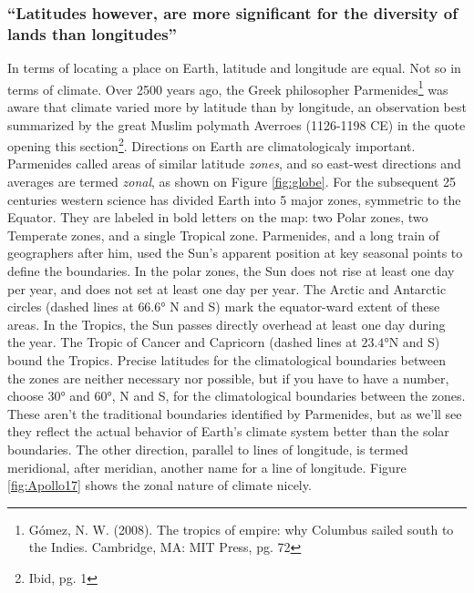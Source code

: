 \documentclass[amstex,12pt]{book}
\begin{document}
\subsubsection{``Latitudes however, are more significant for the diversity of lands than longitudes''}
In terms of locating a place on Earth, latitude and longitude are equal. Not so in terms of climate. Over 2500 years ago, the Greek philosopher Parmenides\footnote{G\'{o}mez, N. W. (2008). The tropics of empire: why Columbus sailed south to the Indies. Cambridge, MA: MIT Press, pg. 72} was aware that climate varied more by latitude than by longitude, an observation best summarized by the great Muslim polymath Averro{\:e}s (1126-1198 CE) in the quote opening this section\footnote{Ibid, pg. 1}. Directions on Earth are climatologicaly important.\\
Parmenides called areas of similar latitude \emph{zones}, and so east-west directions and averages are termed \emph{zonal}, as shown on Figure \ref{fig:globe}. For the subsequent 25 centuries western science has divided Earth into 5 major zones, symmetric to the Equator. They are labeled in bold letters on the map: two Polar zones, two Temperate zones, and a single Tropical zone. Parmenides, and a long train of geographers after him, used the Sun's apparent position at key seasonal points to define the boundaries. In the polar zones, the Sun does not rise at least one day per year, and does not set at least one day per year. The Arctic and Antarctic circles (dashed lines at $\ang{66.6}$ N and S) mark the equator-ward extent of these areas. In the Tropics, the Sun passes directly overhead at least one day during the year. The Tropic of Cancer and Capricorn (dashed lines at $\ang{23.4}$N and S) bound the Tropics. Precise latitudes for the climatological boundaries between the zones are neither necessary nor possible, but if you have to have a number, choose $\ang{30}$ and $\ang{60}$, N and S, for the climatological boundaries between the zones. These aren't the traditional boundaries identified by Parmenides, but as we'll see they reflect the actual behavior of Earth's climate system better than the solar boundaries. The other direction, parallel to lines of longitude, is termed meridional, after meridian, another name for a line of longitude. Figure \ref{fig:Apollo17} shows the zonal nature of climate nicely. \\
\end{document}
